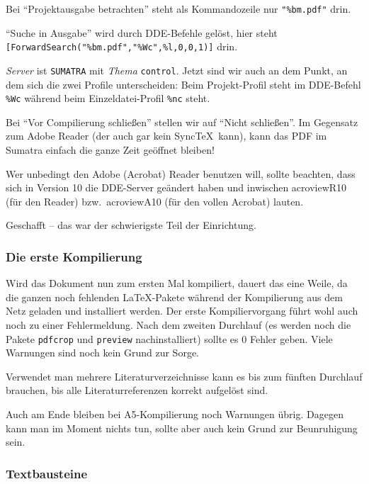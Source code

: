 Bei \enquote{Projektausgabe betrachten} steht als Kommandozeile nur \verb+"%bm.pdf"+ drin.

\enquote{Suche in Ausgabe} wird durch DDE-Befehle gelöst, hier steht\\
\verb+[ForwardSearch("%bm.pdf","%Wc",%l,0,0,1)]+ drin.

\emph{Server} ist \texttt{SUMATRA} mit \emph{Thema} \texttt{control}. Jetzt sind wir auch an dem Punkt, an dem sich die zwei Profile unterscheiden: Beim Projekt-Profil steht im DDE-Befehl \verb+%Wc+
 während beim Einzeldatei-Profil \verb+%nc+ steht.

Bei \enquote{Vor Compilierung schließen} stellen wir auf \enquote{Nicht schließen}. Im Gegensatz zum Adobe Reader (der auch gar kein Sync\TeX\ kann), kann das PDF im Sumatra einfach die ganze Zeit geöffnet bleiben!

Wer unbedingt den Adobe (Acrobat) Reader benutzen will, sollte beachten, dass sich in Version 10 die DDE-Server geändert haben und inwischen acroviewR10 (für den Reader) bzw.\ acroviewA10 (für den vollen Acrobat) lauten.

Geschafft -- das war der schwierigste Teil der Einrichtung.

\subsubsection{Die erste Kompilierung}

Wird das Dokument nun zum ersten Mal kompiliert, dauert das eine Weile, da die ganzen noch fehlenden LaTeX-Pakete während der Kompilierung aus dem Netz geladen und installiert werden. Der erste Kompiliervorgang führt wohl auch noch zu einer Fehlermeldung. Nach dem zweiten Durchlauf (es werden noch die Pakete \texttt{pdfcrop} und \texttt{preview} nachinstalliert) sollte es 0 Fehler geben. Viele Warnungen sind noch kein Grund zur Sorge.

Verwendet man mehrere Literaturverzeichnisse kann es bis zum fünften Durchlauf brauchen, bis alle Literaturreferenzen korrekt aufgelöst sind.

Auch am Ende bleiben bei A5-Kompilierung noch  Warnungen übrig. Dagegen kann man im Moment nichts tun, sollte aber auch kein Grund zur Beunruhigung sein.

\subsubsection{Textbausteine}

